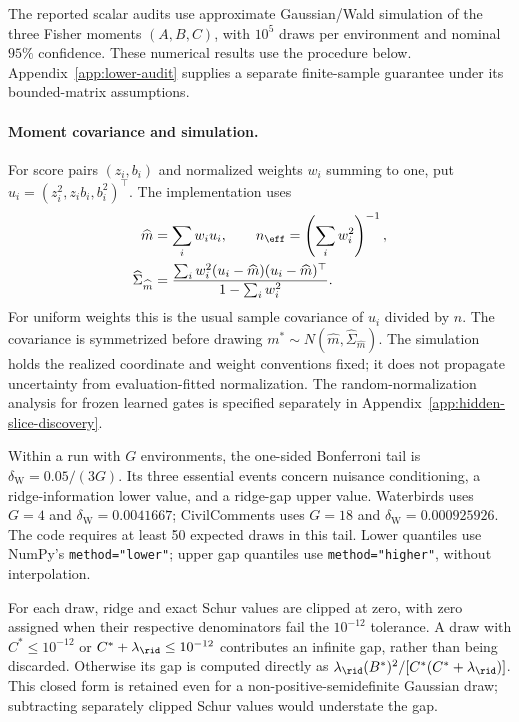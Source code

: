 The reported scalar audits use approximate Gaussian/Wald simulation of the three Fisher moments $(A,B,C)$, with $10^5$ draws per environment and nominal $95\%$ confidence. These numerical results use the procedure below. Appendix~\ref{app:lower-audit} supplies a separate finite-sample guarantee under its bounded-matrix assumptions.

\paragraph{Moment covariance and simulation.}
For score pairs $(z_i,b_i)$ and normalized weights $w_i$ summing to one, put $u_i=(z_i^2,z_ib_i,b_i^2)^\top$. The implementation uses
\begin{equation}
\begin{aligned}
\widehat m&=\sum_iw_iu_i,
\qquad n_{\eff}=\left(\sum_iw_i^2\right)^{-1},\\
\widehat\Sigma_{\widehat m}
&=\frac{\sum_iw_i^2(u_i-\widehat m)(u_i-\widehat m)^\top}
{1-\sum_iw_i^2}.
\end{aligned}
\label{eq:appB-wald-covariance}
\end{equation}
For uniform weights this is the usual sample covariance of $u_i$ divided by $n$. The covariance is symmetrized before drawing $m^*\sim N(\widehat m,\widehat\Sigma_{\widehat m})$. The simulation holds the realized coordinate and weight conventions fixed; it does not propagate uncertainty from evaluation-fitted normalization. The random-normalization analysis for frozen learned gates is specified separately in Appendix~\ref{app:hidden-slice-discovery}.

Within a run with $G$ environments, the one-sided Bonferroni tail is $\delta_{\mathrm W}=0.05/(3G)$. Its three essential events concern nuisance conditioning, a ridge-information lower value, and a ridge-gap upper value. Waterbirds uses $G=4$ and $\delta_{\mathrm W}=0.0041667$; CivilComments uses $G=18$ and $\delta_{\mathrm W}=0.000925926$. The code requires at least 50 expected draws in this tail. Lower quantiles use NumPy's \texttt{method="lower"}; upper gap quantiles use \texttt{method="higher"}, without interpolation.

For each draw, ridge and exact Schur values are clipped at zero, with zero assigned when their respective denominators fail the $10^{-12}$ tolerance. A draw with $C^*\le10^{-12}$ or $C^*+\lambda_{\rid}\le10^{-12}$ contributes an infinite gap, rather than being discarded. Otherwise its gap is computed directly as $\lambda_{\rid}(B^*)^2/[C^*(C^*+\lambda_{\rid})]$. This closed form is retained even for a non-positive-semidefinite Gaussian draw; subtracting separately clipped Schur values would understate the gap.

